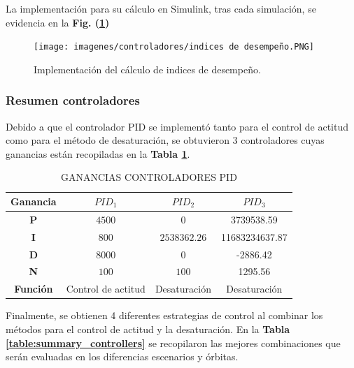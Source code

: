 La implementación para su cálculo en Simulink, tras cada simulación, se evidencia en la \textbf{Fig. (\ref{fig:indicesP})}

\begin{figure}[!h]
	\begin{center}
		\texttt{[image: imagenes/controladores/indices de desempeño.PNG]}\\
	\end{center}
	\caption{Implementación del cálculo de indices de desempeño.}
	\label{fig:indicesP}	 	
\end{figure}

\newpage
\subsubsection{Resumen controladores}
\hfill \break
Debido a que el controlador PID se implementó tanto para el control de actitud como para el método de desaturación, se obtuvieron 3 controladores cuyas ganancias están recopiladas en la \textbf{Tabla \ref{table:gananciasPID}}.

\begin{table}[h]
	\caption{\MakeUppercase{Ganancias controladores PID }}
	\begin{center}
		\begin{tabular}{ c | c c c}
			\textbf{Ganancia}&  \mbox{\boldmath$PID_1$} & \mbox{\boldmath$PID_2$} & \mbox{\boldmath$PID_3$}\\ \hline			
			\textbf{P} &  $4500$ & $0$ & 3739538.59 \\ 
			\textbf{I}  &  $800$ & $2538362.26$ &11683234637.87 \\ 
			\textbf{D}  &  $8000$ & $0$ & -2886.42 \\
			\textbf{N}  &  $100$ & $100$ & 1295.56\\ \hline
			\textbf{Función} &  Control de actitud & Desaturación & Desaturación \\ 			
		\end{tabular}
	\end{center}
	\label{table:gananciasPID}
\end{table}

Finalmente, se obtienen 4 diferentes estrategias de control al combinar los métodos para el control de actitud y la desaturación. En la \textbf{Tabla \ref{table:summary_controllers}} se recopilaron las mejores combinaciones que serán evaluadas en los diferencias escenarios y órbitas.

